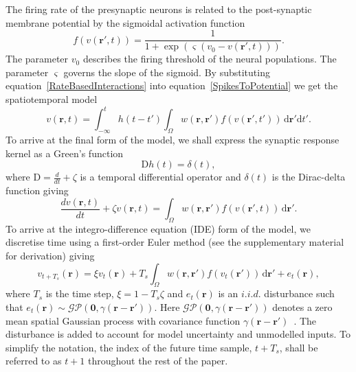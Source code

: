 \documentclass[12pt]{iopart}
\begin{document}
The firing rate of the presynaptic neurons is related to the post-synaptic membrane potential by the sigmoidal activation function 
\begin{equation}
	\label{ActivationFunction} f\left( v\left( \mathbf{r}', t \right) \right) = \frac{1}{1 + \exp \left( \varsigma \left( v_0 - v\left(\mathbf{r}',t\right) \right) \right)}. 
\end{equation}
The parameter $v_0$ describes the  firing threshold of the neural populations. The parameter $\varsigma$ governs the slope of the sigmoid. By substituting equation~\ref{RateBasedInteractions} into equation~\ref{SpikesToPotential} we get the spatiotemporal model 
\begin{equation}
	\label{FullDoubleIntModel} v\left(\mathbf{r},t\right) =
	\int_{-\infty}^t 
	h\left(t - t'\right) \int_\Omega
	w\left(\mathbf{r},\mathbf{r}'\right) 
	f\left( v\left( \mathbf{r}',t' \right)\right)
	\, \mathrm{d} \mathbf{r}' \mathrm{d}t'.
\end{equation}
To arrive at the final form of the model, we shall express the synaptic response kernel as a Green's function 
\begin{equation}
	\label{GreensFuncDef} \textrm{D}h\left( t \right) = \delta \left( t \right), 
\end{equation}
where $\textrm{D}=\frac{d}{dt} + \zeta$ is a temporal differential operator and $\delta(t)$ is the Dirac-delta function giving 
\begin{equation}
	\label{FinalFormContinuous} 
	\frac{dv\left( \mathbf{r},t \right)}{dt} + \zeta v\left( \mathbf{r},t \right) = \int_\Omega {w\left( \mathbf{r},\mathbf{r}' \right)f\left( {v\left( \mathbf{r}',t \right)} \right)\, \mathrm{d}\mathbf{r}'}. 
\end{equation}
To arrive at the integro-difference equation (IDE) form of the model, we discretise time using a first-order Euler method (see the supplementary material for derivation) giving 
\begin{equation}
	\label{DiscreteTimeModel} 
	v_{t+T_s}\left(\mathbf{r}\right) = 
	\xi v_t\left(\mathbf{r}\right) + 
	T_s \int_\Omega { 
	    w\left(\mathbf{r},\mathbf{r}'\right)
	    f\left(v_t\left(\mathbf{r}'\right)\right) 
	\, \mathrm{d}\mathbf{r}'} 
	+ e_t\left(\mathbf{r}\right), 
\end{equation}
where $T_s$ is the time step, $\xi = 1-T_s\zeta $ and $e_t(\mathbf{r})$ is an $i.i.d.$ disturbance such that $e_t(\mathbf{r})\sim\mathcal{GP}(\mathbf 0,\gamma(\mathbf{r}-\mathbf{r}'))$. Here $\mathcal{GP}(\mathbf 0,\gamma(\mathbf{r}-\mathbf{r}'))$ denotes a zero mean spatial Gaussian process with covariance function $\gamma(\mathbf{r}-\mathbf{r}')$~\cite{Rasmussen2005}. The disturbance is added to account for model uncertainty and unmodelled inputs. To simplify the notation, the index of the future time sample, $t+T_s$, shall be referred to as $t+1$ throughout the rest of the paper. 
\end{document}

